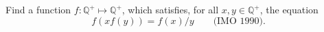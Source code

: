 Find a function $f : \mathbb{Q}^+ \mapsto \mathbb{Q}^+$, which satisfies, for all $x, y \in \mathbb{Q}^+$, the equation
\[ f(xf(y)) = f(x)/y \qquad \text{(IMO 1990).} \]
